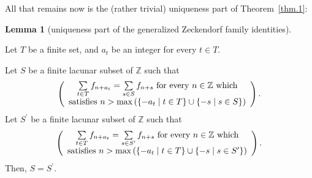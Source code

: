 \documentclass[numbers=enddot,12pt,final,onecolumn,notitlepage]{scrartcl}%
\numberwithin{exer}{section}
\theoremstyle{definition}
\newtheorem{lem}[theo]{Lemma}
\newenvironment{lemma}[1][]
{\begin{lem}[#1]\begin{leftbar}}
{\end{leftbar}\end{lem}}
\let\sumnonlimits\sum
\renewcommand{\sum}{\sumnonlimits\limits}
\begin{document}
All that remains now is the (rather trivial) uniqueness part of Theorem~\ref{thm.1}:

\begin{lemma}[uniqueness part of the generalized Zeckendorf family
identities] \label{lem.9}
Let $T$ be a finite set, and $a_{t}$ be an integer for every
$t\in T$.

Let $S$ be a finite lacunar subset of $\mathbb{Z}$ such that%
\[
\left(
\begin{array}
[c]{c}%
\sum\limits_{t\in T}f_{n+a_{t}}=\sum\limits_{s\in S}f_{n+s}\text{ for every
}n\in\mathbb{Z}\text{ which}\\
\text{satisfies }n>\max\left(  \left\{  -a_{t}\mid t\in T\right\}
\cup\left\{  -s\mid s\in S\right\}  \right)
\end{array}
\right)  .
\]
Let $S^{\prime}$ be a finite lacunar subset of $\mathbb{Z}$ such that%
\[
\left(
\begin{array}
[c]{c}%
\sum\limits_{t\in T}f_{n+a_{t}}=\sum\limits_{s\in S^{\prime}}f_{n+s}\text{ for
every }n\in\mathbb{Z}\text{ which}\\
\text{satisfies }n>\max\left(  \left\{  -a_{t}\mid t\in T\right\}
\cup\left\{  -s\mid s\in S^{\prime}\right\}  \right)
\end{array}
\right)  .
\]
Then, $S=S^{\prime}$.
\end{lemma}
\end{document}
